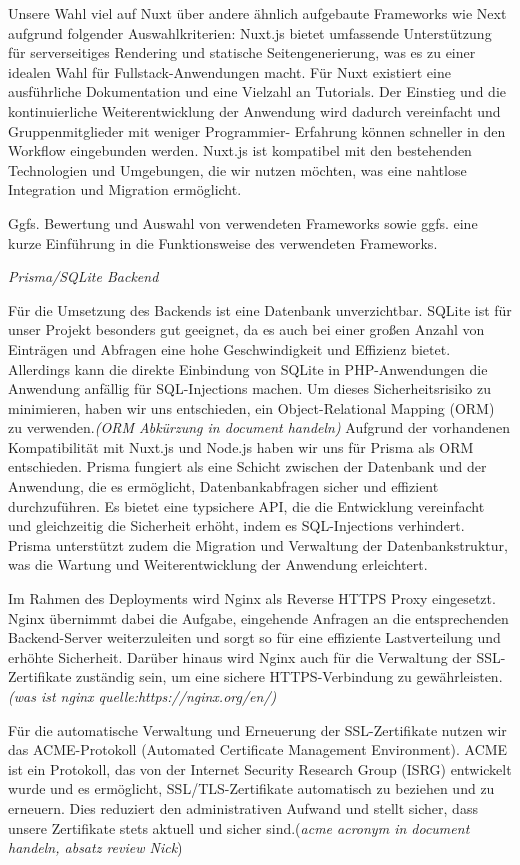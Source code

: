 \documentclass[a4paper,12pt]{article}
\begin{document}
Unsere Wahl viel auf Nuxt über andere ähnlich aufgebaute Frameworks wie Next aufgrund folgender Auswahlkriterien:
Nuxt.js bietet umfassende Unterstützung für serverseitiges Rendering und statische Seitengenerierung, was es zu einer idealen Wahl für Fullstack-Anwendungen macht.
Für Nuxt existiert eine ausführliche Dokumentation und eine Vielzahl an Tutorials. Der Einstieg und die kontinuierliche Weiterentwicklung der Anwendung wird dadurch vereinfacht und Gruppenmitglieder mit weniger Programmier- Erfahrung können schneller in den Workflow eingebunden werden.
Nuxt.js ist kompatibel mit den bestehenden Technologien und Umgebungen, die wir nutzen möchten, was eine nahtlose Integration und Migration ermöglicht.

Ggfs. Bewertung und Auswahl von verwendeten Frameworks sowie ggfs. eine kurze
Einführung in die Funktionsweise des verwendeten Frameworks.

\textit{Prisma/SQLite Backend }

Für die Umsetzung des Backends ist eine Datenbank unverzichtbar. SQLite ist für unser Projekt besonders gut geeignet, da es auch bei einer großen Anzahl von Einträgen und Abfragen eine hohe Geschwindigkeit und Effizienz bietet. Allerdings kann die direkte Einbindung von SQLite in PHP-Anwendungen die Anwendung anfällig für SQL-Injections machen. Um dieses Sicherheitsrisiko zu minimieren, haben wir uns entschieden, ein Object-Relational Mapping (ORM) zu verwenden.\textit{(ORM Abkürzung in document handeln)}
Aufgrund der vorhandenen Kompatibilität mit Nuxt.js und Node.js haben wir uns für Prisma als ORM entschieden. Prisma fungiert als eine Schicht zwischen der Datenbank und der Anwendung, die es ermöglicht, Datenbankabfragen sicher und effizient durchzuführen. Es bietet eine typsichere API, die die Entwicklung vereinfacht und gleichzeitig die Sicherheit erhöht, indem es SQL-Injections verhindert. Prisma unterstützt zudem die Migration und Verwaltung der Datenbankstruktur, was die Wartung und Weiterentwicklung der Anwendung erleichtert.

Im Rahmen des Deployments wird Nginx als Reverse HTTPS Proxy eingesetzt. Nginx übernimmt dabei die Aufgabe, eingehende Anfragen an die entsprechenden Backend-Server weiterzuleiten und sorgt so für eine effiziente Lastverteilung und erhöhte Sicherheit. Darüber hinaus wird Nginx auch für die Verwaltung der SSL-Zertifikate zuständig sein, um eine sichere HTTPS-Verbindung zu gewährleisten.\textit{(was ist nginx quelle:https://nginx.org/en/)}

Für die automatische Verwaltung und Erneuerung der SSL-Zertifikate nutzen wir das ACME-Protokoll (Automated Certificate Management Environment). ACME ist ein Protokoll, das von der Internet Security Research Group (ISRG) entwickelt wurde und es ermöglicht, SSL/TLS-Zertifikate automatisch zu beziehen und zu erneuern. Dies reduziert den administrativen Aufwand und stellt sicher, dass unsere Zertifikate stets aktuell und sicher sind.(\textit{acme acronym in document handeln, absatz review Nick})
\end{document}
